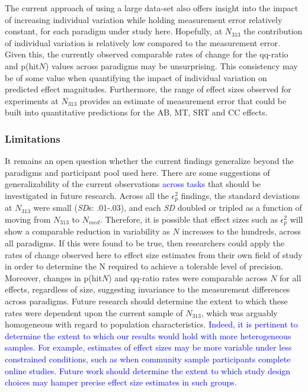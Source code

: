 \documentclass[
  man]{apa6}
\begin{document}
The current approach of using a large data-set also offers insight into the impact of increasing individual variation while holding measurement error relatively constant, for each paradigm under study here. Hopefully, at \(N_{313}\) the contribution of individual variation is relatively low compared to the measurement error. Given this, the currently observed comparable rates of change for the qq-ratio and p(hit\textbar{}\(N\)) values across paradigms may be unsurprising. This consistency may be of some value when quantifying the impact of individual variation on predicted effect magnitudes. Furthermore, the range of effect sizes observed for experiments at \(N_{313}\) provides an estimate of measurement error that could be built into quantitative predictions for the AB, MT, SRT and CC effects.

\hypertarget{limitations}{%
\subsubsection{Limitations}\label{limitations}}

It remains an open question whether the current findings generalize beyond the paradigms and participant pool used here. There are some suggestions of generalizability of the current observations \textcolor{blue}{across tasks} that should be investigated in future research. Across all the \(\epsilon_{p}^2\) findings, the standard deviations at \(N_{313}\) were small (\emph{SD}s: .01-.03), and each \emph{SD} doubled or tripled as a function of moving from \(N_{313}\) to \(N_{med}\). Therefore, it is possible that effect sizes such as \(\epsilon_{p}^2\) will show a comparable reduction in variability as \(N\) increases to the hundreds, across all paradigms. If this were found to be true, then researchers could apply the rates of change observed here to effect size estimates from their own field of study in order to determine the N required to achieve a tolerable level of precision. Moreover, changes in p(hit\textbar{}\(N\)) and qq-ratio rates were comparable across \(N\) for all effects, regardless of size, suggesting invariance to the measurement differences across paradigms. Future research should determine the extent to which these rates were dependent upon the current sample of \(N_{313}\), which was arguably homogeneous with regard to population characteristics. \textcolor{blue}{Indeed, it is pertinent to determine the extent to which our results would hold with more heterogeneous samples. For example, estimates of effect sizes may be more variable under less constrained conditions, such as when community sample participants complete online studies. Future work should determine the extent to which study design choices may hamper precise effect size estimates in such groups.}
\end{document}
